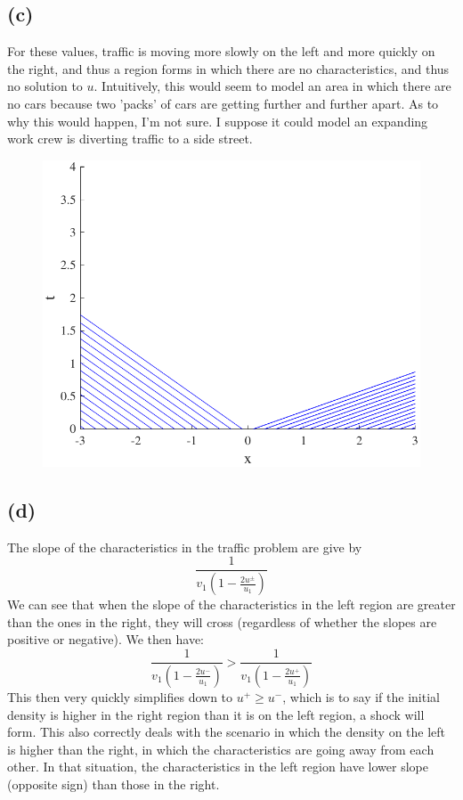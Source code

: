 \documentclass{article}
\begin{document}
\subsection*{(c)}
For these values, traffic is moving more slowly on the left and more quickly on the right, and thus a region forms in which there are no characteristics, and thus no solution to $u$. Intuitively, this would seem to model an area in which there are no cars because two 'packs' of cars are getting further and further apart. As to why this would happen, I'm not sure. I suppose it could model an expanding work crew is diverting traffic to a side street.
\begin{figure}[!htbp]
  \centering
    \includegraphics[width=.49\textwidth]{hw_14_plot16.pdf}
    \caption{}
\end{figure}
\FloatBarrier
\subsection*{(d)}

The slope of the characteristics in the traffic problem are give by 
\begin{equation}
\frac{1}{v_1(1-\frac{2u^{\pm}}{u_1})}
\end{equation}
We can see that when the slope of the characteristics in the left region are greater than the ones in the right, they will cross (regardless of whether the slopes are positive or negative). We then have:
\begin{equation}
\frac{1}{v_1(1-\frac{2u^-}{u_1})} > \frac{1}{v_1(1-\frac{2u^+}{u_1})}
\end{equation}
This then very quickly simplifies down to $u^+ \geq u^-$, which is to say if the initial density is higher in the right region than it is on the left region, a shock will form. This also correctly deals with the scenario in which the density on the left is higher than the right, in which the characteristics are going away from each other. In that situation, the characteristics in the left region have lower slope (opposite sign) than those in the right. 
\end{document}
